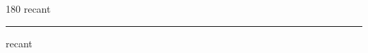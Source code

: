 
\begin{frame}
\begin{center}
\begin{turn}{180}
{\fontsize{2.5cm}{1em}\selectfont recant}
\end{turn}
\vspace{1em}\par  
\hrule
\vspace{1em}\par  
{\fontsize{2.5cm}{1em}\selectfont recant}
\end{center}
\end{frame}
